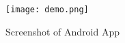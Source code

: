 \documentclass[conference]{IEEEtran}
\begin{document}
\begin{figure}[!t]
\centering
\texttt{[image: demo.png]}
\caption{Screenshot of Android App}
\label{fig:app_screenshot}
\end{figure}

%
%



%
%
\end{document}
